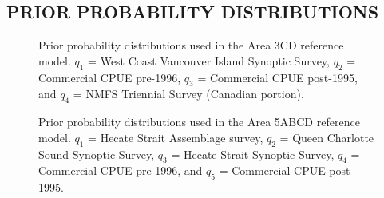 \documentclass[11pt]{book}
\begin{document}
\hypertarget{prior-probability-distributions}{%
\subsection{PRIOR PROBABILITY DISTRIBUTIONS}\label{prior-probability-distributions}}
\begin{figure}[htb]

{\centering {} 

}

\caption{Prior probability distributions used in the Area 3CD reference model. $q_1$ = West Coast Vancouver Island Synoptic Survey, $q_2$ = Commercial CPUE pre-1996, $q_3$ = Commercial CPUE post-1995, and $q_4$ = NMFS Triennial Survey (Canadian portion).}\label{fig:fig-base-mcmc-priors-3cd}
\end{figure}
\begin{figure}[htb]

{\centering {} 

}

\caption{Prior probability distributions used in the Area 5ABCD reference model. $q_1$ = Hecate Strait Assemblage survey, $q_2$ = Queen Charlotte Sound Synoptic Survey, $q_3$ = Hecate Strait Synoptic Survey, $q_4$ = Commercial CPUE pre-1996, and $q_5$ = Commercial CPUE post-1995.}\label{fig:fig-base-mcmc-priors-5abcd}
\end{figure}
\clearpage
\end{document}
